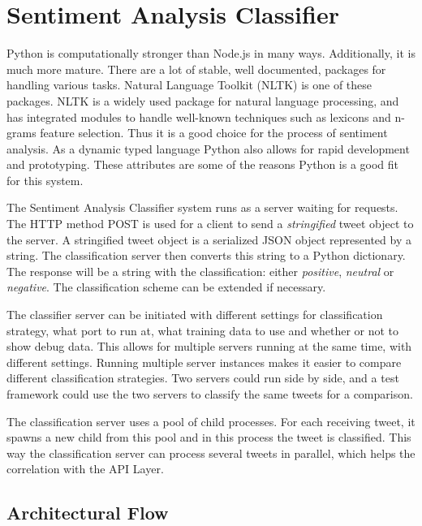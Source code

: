 \section{Sentiment Analysis Classifier}

Python is computationally stronger than Node.js in many ways. Additionally, it is much more mature. There are a lot of stable, well documented, packages for handling various tasks. Natural Language Toolkit (NLTK) is one of these packages. NLTK is a widely used package for natural language processing, and has integrated modules to handle well-known techniques such as lexicons and n-grams feature selection. Thus it is a good choice for the process of sentiment analysis. As a dynamic typed language Python also allows for rapid development and prototyping. These attributes are some of the reasons Python is a good fit for this system. 

The Sentiment Analysis Classifier system runs as a server waiting for requests. The HTTP method POST is used for a client to send a \textit{stringified} tweet object to the server. A stringified tweet object is a serialized JSON object represented by a string. The classification server then converts this string to a Python dictionary. The response will be a string with the classification: either \textit{positive}, \textit{neutral} or \textit{negative}. The classification scheme can be extended if necessary. 

The classifier server can be initiated with different settings for classification strategy, what port to run at, what training data to use and whether or not to show debug data. This allows for multiple servers running at the same time, with different settings. Running multiple server instances makes it easier to compare different classification strategies. Two servers could run side by side, and a test framework could use the two servers to classify the same tweets for a comparison.

The classification server uses a pool of child processes. For each receiving tweet, it spawns a new child from this pool and in this process the tweet is classified. This way the classification server can process several tweets in parallel, which helps the correlation with the API Layer.

\subsection{Architectural Flow}

